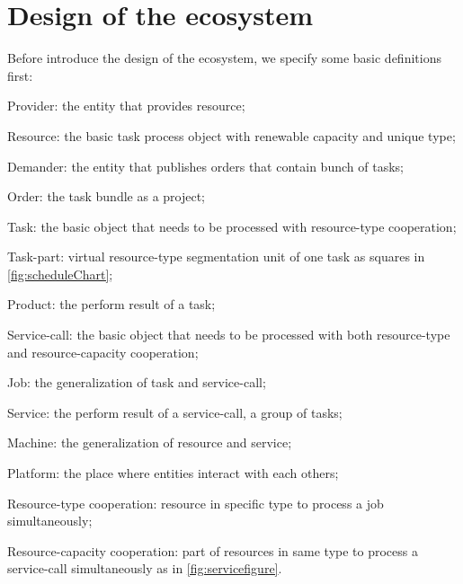 \section{Design of the ecosystem} %
\label{sec:design_of_the_ecosystem}
Before introduce the design of the ecosystem, we specify some basic definitions first:
\begin{compactitem}
	\item Provider: the entity that provides resource;
	\item Resource: the basic task process object with renewable capacity and unique type;
	\item Demander: the entity that publishes orders that contain bunch of tasks;
	\item Order: the task bundle as a project;
	\item Task: the basic object that needs to be processed with resource-type cooperation;
	\item Task-part: virtual resource-type segmentation unit of one task as squares in \autoref{fig:scheduleChart};
	\item Product: the perform result of a task;
    \item Service-call: the basic object that needs to be processed with both resource-type and resource-capacity cooperation;
    \item Job: the generalization of task and service-call;
    \item Service: the perform result of a service-call, a group of tasks;
    \item Machine: the generalization of resource and service;
	\item Platform: the place where entities interact with each others;
    \item Resource-type cooperation: resource in specific type to process a job simultaneously;
    \item Resource-capacity cooperation: part of resources in same type to process a service-call simultaneously as in \autoref{fig:servicefigure}.
\end{compactitem}

